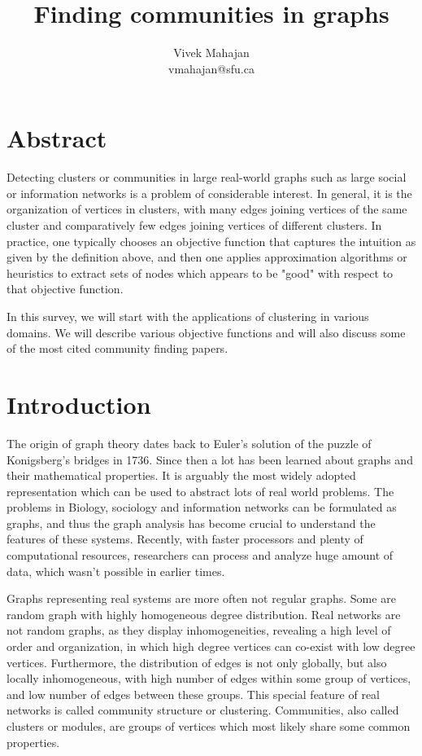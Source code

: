 \documentclass[letterpaper]{article}
\begin{document}
%
\title{Finding communities in graphs}
\author{Vivek Mahajan\\
vmahajan@sfu.ca\\
}
\maketitle
\section*{Abstract}
Detecting clusters or communities in large real-world graphs such as large
social or information networks is a problem of considerable interest. In
general, it is the organization of vertices in clusters, with many edges
joining vertices of the same cluster and comparatively few edges joining
vertices of different clusters.  In practice, one typically chooses an
objective function that captures the intuition as given by the definition above,
and then one applies approximation algorithms or heuristics to extract sets of
nodes which appears to be "good" with respect to that objective function.

In this survey, we will start with the applications of clustering in various
domains. We will describe various objective functions and will also discuss
some of the most cited community finding papers. 


\section{Introduction}
The origin of graph theory dates back to Euler's solution of the puzzle of
Konigsberg's bridges in 1736.  Since then a lot has been learned about graphs
and their mathematical properties. It is arguably the most widely adopted
representation which can be used to abstract lots of  real world problems. The
problems in Biology, sociology and information networks can be formulated as
graphs, and thus the graph analysis has become crucial to understand the
features of these systems. Recently, with faster processors and plenty of
computational resources, researchers can process and analyze huge amount of
data, which wasn't possible in earlier times.

Graphs representing real systems are more often not regular graphs. Some are
random graph with highly homogeneous degree distribution. Real networks are not
random graphs, as they display inhomogeneities, revealing a high level of order
and organization, in which high degree vertices can co-exist with low degree
vertices. Furthermore, the distribution of edges is not only globally, but also
locally inhomogeneous, with high number of edges within some group of vertices,
and low number of edges between these groups. This special feature of real
networks is called community structure or clustering. Communities, also called
clusters or modules, are groups of vertices which most likely share some common
properties. 
\end{document}
